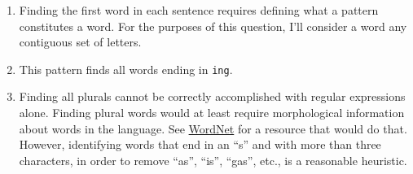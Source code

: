 \documentclass[]{book}
\newenvironment{Shaded}{\begin{snugshade}}{\end{snugshade}}
\newcommand{\CharTok}[1]{\textcolor[rgb]{0.31,0.60,0.02}{#1}}
\newcommand{\CommentTok}[1]{\textcolor[rgb]{0.56,0.35,0.01}{\textit{#1}}}
\newcommand{\KeywordTok}[1]{\textcolor[rgb]{0.13,0.29,0.53}{\textbf{#1}}}
\newcommand{\NormalTok}[1]{#1}
\newcommand{\OperatorTok}[1]{\textcolor[rgb]{0.81,0.36,0.00}{\textbf{#1}}}
\newcommand{\StringTok}[1]{\textcolor[rgb]{0.31,0.60,0.02}{#1}}
\theoremstyle{plain}
\theoremstyle{remark}
\begin{document}
\begin{enumerate}
\def\labelenumi{\arabic{enumi}.}
\item
  Finding the first word in each sentence requires defining what a pattern constitutes a word. For the purposes of this question,
  I'll consider a word any contiguous set of letters.

\begin{Shaded}
\end{Shaded}
\item
  This pattern finds all words ending in \texttt{ing}.

\begin{Shaded}
\end{Shaded}
\item
  Finding all plurals cannot be correctly accomplished with regular expressions alone.
  Finding plural words would at least require morphological information about words in the language.
  See \href{https://cran.r-project.org/web/packages/wordnet/index.html}{WordNet} for a resource that would do that.
  However, identifying words that end in an ``s'' and with more than three characters, in order to remove ``as'', ``is'', ``gas'', etc., is
  a reasonable heuristic.

\begin{Shaded}
\end{Shaded}
\end{enumerate}
\end{document}
